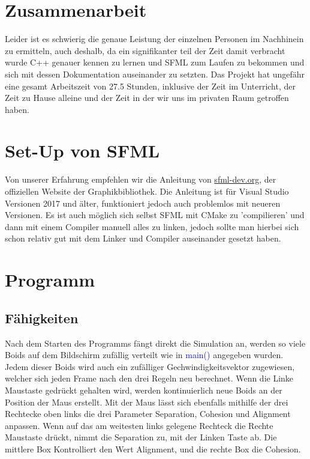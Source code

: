 \documentclass{article}
\begin{document}
    \section{Zusammenarbeit}
    Leider ist es schwierig die genaue Leistung der einzelnen Personen im Nachhinein zu ermitteln, auch deshalb, da ein signifikanter teil der Zeit damit verbracht wurde C++ genauer kennen zu lernen und SFML zum Laufen zu bekommen und sich mit dessen Dokumentation auseinander zu setzten. Das Projekt hat ungefähr eine gesamt Arbeitszeit von 27.5 Stunden, inklusive der Zeit im Unterricht, der Zeit zu Hause alleine und der Zeit in der wir uns im privaten Raum getroffen haben.
    
    \section{Set-Up von SFML}
    Von unserer Erfahrung empfehlen wir die Anleitung von \href{https://www.sfml-dev.org/tutorials/2.5/start-vc.php}{sfml-dev.org}, der offiziellen Website der Graphikbibliothek. Die Anleitung ist für Visual Studio Versionen 2017 und älter, funktioniert jedoch auch problemlos mit neueren Versionen. Es ist auch möglich sich selbst SFML mit CMake zu 'compilieren' und dann mit einem Compiler manuell alles zu linken, jedoch sollte man hierbei sich schon relativ gut mit dem Linker und Compiler auseinander gesetzt haben.
    
    \section{Programm}
        \subsection{Fähigkeiten}
            Nach dem Starten des Programms fängt direkt die Simulation an, werden so viele Boids auf dem Bildschirm zufällig verteilt wie in \textcolor{blue}{main()} angegeben wurden. Jedem dieser Boids wird auch ein zufälliger Gechwindigkeitsvektor zugewiesen, welcher sich jeden Frame nach den drei Regeln neu berechnet. Wenn die Linke Maustaste gedrückt gehalten wird, werden kontinuierlich neue Boids an der Position der Maus erstellt. Mit der Maus lässt sich ebenfalls mithilfe der drei Rechtecke oben links die drei Parameter Separation, Cohesion und Alignment anpassen. Wenn auf das am weitesten links gelegene Rechteck die Rechte Maustaste drückt, nimmt die Separation zu, mit der Linken Taste ab. Die mittlere Box Kontrolliert den Wert Alignment, und die rechte Box die Cohesion.
        
\end{document}
